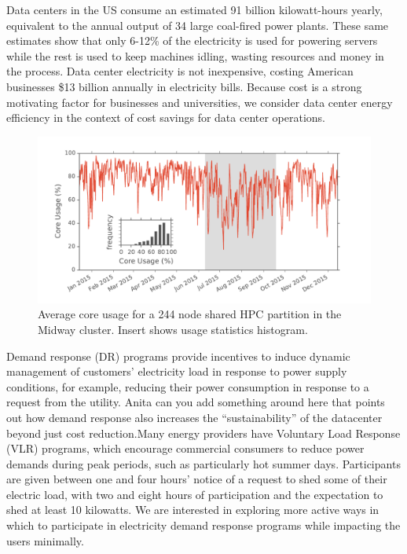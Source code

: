 \documentclass[letterpaper,twocolumn,10pt]{article}
\begin{document}
Data centers in the US consume an estimated 91 billion kilowatt-hours yearly, equivalent to the annual output of 34 large coal-fired power plants.\cite{Delforge2014} These same estimates show that only 6-12\% of the electricity is used for powering servers while the rest is used to keep machines idling, wasting resources and money in the process. Data center electricity is not inexpensive, costing American businesses \$13 billion annually in electricity bills.\cite{Delforge2014} Because cost is a strong motivating factor for businesses and universities, we consider data center energy efficiency in the context of cost savings for data center operations. \\

\begin{figure}[t]
	\begin{center}
		\includegraphics[scale=0.38]{pwr_model_ins}
	\end{center}
	\caption{Average core usage for a 244 node shared HPC partition in the Midway cluster. Insert shows usage statistics histogram.}
	\label{prw_model_ins}
\end{figure}

Demand response (DR) programs provide incentives to induce dynamic management of customers’ electricity load in response to power supply conditions, for example, reducing their power consumption in response to a request from the utility.\cite{7039172} Anita can you add something around here that points out how demand response also increases the “sustainability” of the datacenter beyond just cost reduction.Many energy providers have Voluntary Load Response (VLR) programs, which encourage commercial consumers to reduce power demands during peak periods, such as particularly hot summer days. Participants are given between one and four hours’ notice of a request to shed some of their electric load, with two and eight hours of participation and the expectation to shed at least 10 kilowatts. We are interested in exploring more active ways in which to participate in electricity demand response programs while impacting the users minimally.   \\
\end{document}
